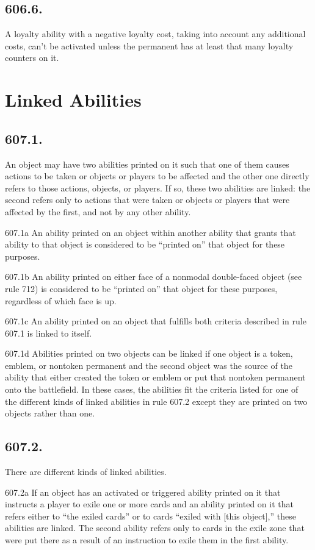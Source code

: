 \subsection*{606.6.}
A loyalty ability with a negative loyalty cost, taking into account any additional costs, can’t be activated unless the permanent has at least that many loyalty counters on it.

\section{Linked Abilities}
\subsection*{607.1.}
An object may have two abilities printed on it such that one of them causes actions to be taken or objects or players to be affected and the other one directly refers to those actions, objects, or players. If so, these two abilities are linked: the second refers only to actions that were taken or objects or players that were affected by the first, and not by any other ability.

607.1a An ability printed on an object within another ability that grants that ability to that object is considered to be “printed on” that object for these purposes.

607.1b An ability printed on either face of a nonmodal double-faced object (see rule 712) is considered to be “printed on” that object for these purposes, regardless of which face is up.

607.1c An ability printed on an object that fulfills both criteria described in rule 607.1 is linked to itself.

607.1d Abilities printed on two objects can be linked if one object is a token, emblem, or nontoken permanent and the second object was the source of the ability that either created the token or emblem or put that nontoken permanent onto the battlefield. In these cases, the abilities fit the criteria listed for one of the different kinds of linked abilities in rule 607.2 except they are printed on two objects rather than one.

\subsection*{607.2.}
There are different kinds of linked abilities.

607.2a If an object has an activated or triggered ability printed on it that instructs a player to exile one or more cards and an ability printed on it that refers either to “the exiled cards” or to cards “exiled with [this object],” these abilities are linked. The second ability refers only to cards in the exile zone that were put there as a result of an instruction to exile them in the first ability.

